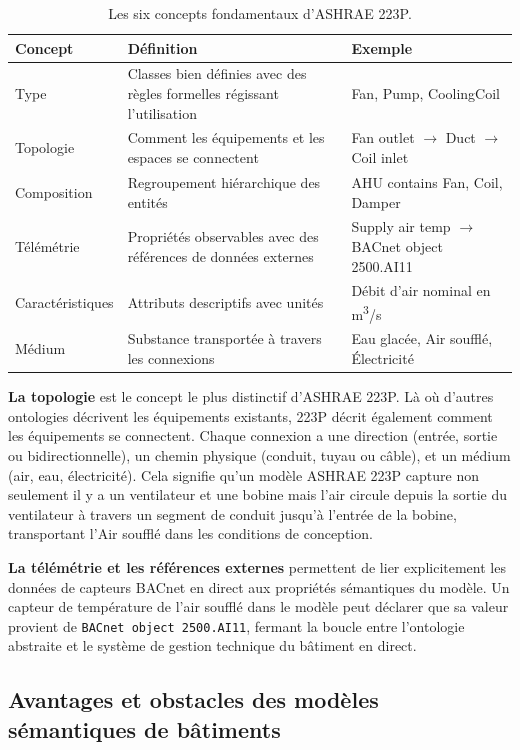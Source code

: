 \begin{table}[htbp]
\centering
\caption{Les six concepts fondamentaux d'ASHRAE 223P.}
\label{tab:223p-concepts}
\small
\begin{tabular}{lp{5.5cm}p{5cm}}
\toprule
\textbf{Concept} & \textbf{Définition} & \textbf{Exemple} \\
\midrule
Type & Classes bien définies avec des règles formelles régissant l'utilisation & Fan, Pump, CoolingCoil \\
Topologie & Comment les équipements et les espaces se connectent & Fan outlet $\to$ Duct $\to$ Coil inlet \\
Composition & Regroupement hiérarchique des entités & AHU contains Fan, Coil, Damper \\
Télémétrie & Propriétés observables avec des références de données externes & Supply air temp $\to$ BACnet object 2500.AI11 \\
Caractéristiques & Attributs descriptifs avec unités & Débit d'air nominal en m\textsuperscript{3}/s \\
Médium & Substance transportée à travers les connexions & Eau glacée, Air soufflé, Électricité \\
\bottomrule
\end{tabular}
\end{table}

\textbf{La topologie} est le concept le plus distinctif d'ASHRAE 223P.
Là où d'autres ontologies décrivent les équipements existants, 223P décrit également comment les équipements se connectent.
Chaque connexion a une direction (entrée, sortie ou bidirectionnelle), un chemin physique (conduit, tuyau ou câble), et un médium (air, eau, électricité).
Cela signifie qu'un modèle ASHRAE 223P capture non seulement \og il y a un ventilateur et une bobine \fg{} mais \og l'air circule depuis la sortie du ventilateur à travers un segment de conduit jusqu'à l'entrée de la bobine, transportant l'Air soufflé dans les conditions de conception. \fg{}

\textbf{La télémétrie et les références externes} permettent de lier explicitement les données de capteurs BACnet en direct aux propriétés sémantiques du modèle.
Un capteur de température de l'air soufflé dans le modèle peut déclarer que sa valeur provient de \texttt{BACnet object 2500.AI11}, fermant la boucle entre l'ontologie abstraite et le système de gestion technique du bâtiment en direct.

\subsection{Avantages et obstacles des modèles sémantiques de bâtiments}
\label{subsec:advantages-barriers}

